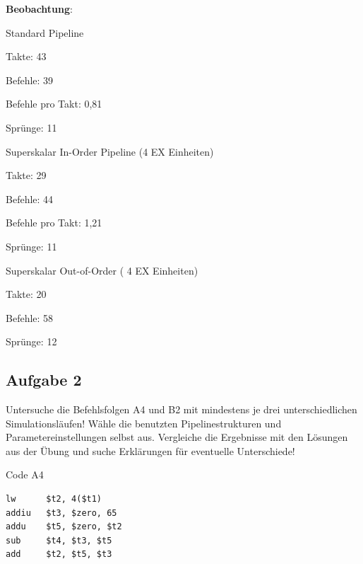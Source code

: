 \documentclass[a4paper,12pt,titlepage]{scrartcl}
\begin{document}
\textbf{Beobachtung}:
\begin{itemize*}
    \item Standard Pipeline
    \begin{itemize*}
        \item Takte: 43
        \item Befehle: 39
        \item Befehle pro Takt: 0,81
        \item Sprünge: 11
    \end{itemize*}
    \item Superskalar In-Order Pipeline (4 EX Einheiten)
    \begin{itemize*}
        \item Takte: 29
        \item Befehle: 44
        \item Befehle pro Takt: 1,21
        \item Sprünge: 11
    \end{itemize*}
    \item Superskalar Out-of-Order ( 4 EX Einheiten)
    \begin{itemize*}
        \item Takte: 20
        \item Befehle: 58
        \item Sprünge: 12
    \end{itemize*}
\end{itemize*}

\newpage
\subsection*{Aufgabe 2}
Untersuche die Befehlsfolgen A4 und B2 mit mindestens je drei unterschiedlichen Simulationsläufen! Wähle die benutzten Pipelinestrukturen und Parametereinstellungen selbst aus. Vergleiche die Ergebnisse mit den Lösungen aus der Übung und suche Erklärungen für eventuelle Unterschiede!

Code A4
\begin{lstlisting}[basicstyle=\tiny]
lw      $t2, 4($t1)
addiu   $t3, $zero, 65
addu    $t5, $zero, $t2
sub     $t4, $t3, $t5
add     $t2, $t5, $t3
\end{lstlisting}
\end{document}
